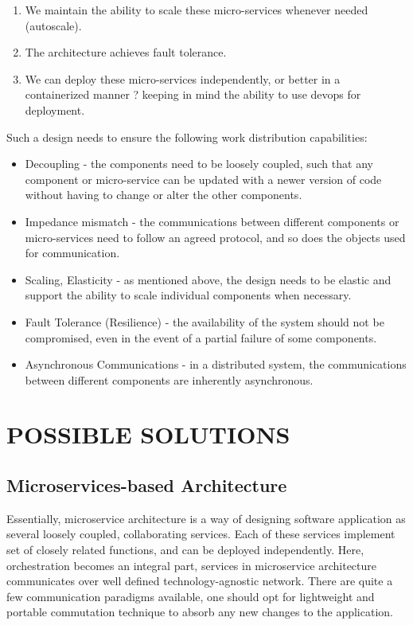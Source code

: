 \documentclass[sigconf]{acmart}
\begin{document}
\begin{enumerate}
\item We maintain the ability to scale these micro-services whenever needed (autoscale).
\item The architecture achieves fault tolerance.
\item We can deploy these micro-services independently, or better in a containerized manner ? keeping in mind the ability to use devops for deployment.
\end{enumerate}

Such a design needs to ensure the following work distribution capabilities:
\begin{itemize}
\item Decoupling - the components need to be loosely coupled, such that any component or micro-service can be updated with a newer version of code without having to change or alter the other components.
\item Impedance mismatch - the communications between different components or micro-services need to follow an agreed protocol, and so does the objects used for communication. 
\item Scaling, Elasticity - as mentioned above, the design needs to be elastic and support the ability to scale individual components when necessary.
\item Fault Tolerance (Resilience) - the availability of the system should not be compromised, even in the event of a partial failure of some components. 
\item Asynchronous Communications - in a distributed system, the communications between different components are inherently asynchronous. 
\end{itemize}	

\section{POSSIBLE SOLUTIONS}

\subsection{Microservices-based Architecture}
Essentially, microservice architecture is a way of designing software application as several loosely coupled, collaborating services. Each of these services implement set of closely related functions, and can be deployed independently. Here, orchestration becomes an integral part, services in microservice architecture communicates over well defined technology-agnostic network. There are quite a few communication paradigms available, one should opt for lightweight and portable commutation technique to absorb any new changes to the application.
\end{document}
